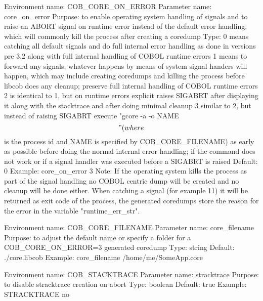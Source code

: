 Environment name:  COB_CORE_ON_ERROR
  Parameter name:  core_on_error
         Purpose:  to enable operating system handling of signals and to
                   raise an ABORT signal on runtime error instead of the
                   default error handling, which will commonly kill the
                   process after creating a coredump
            Type:  0   means catching all default signals and do full
                       internal error handling as done in versions pre 3.2
                       along with full internal handling of COBOL runtime
                       errors
                   1   means to forward any signals; whatever happens
                       by means of system signal handers will happen,
                       which may include creating coredumps and killing
                       the process before libcob does any cleanup; preserve
                       full internal handling of COBOL runtime errors
                   2   is identical to 1, but on runtime errors explicit
                       raises SIGABRT after displaying it along with the  
                       stacktrace and after doing minimal cleanup
                   3   similar to 2, but instead of raising SIGABRT execute
                       "gcore -a -o NAME $$" (where $$ is the process id and
                       NAME is specified by COB_CORE_FILENAME) as early as
                       possible before doing the normal internal error
                       handling; if the command does not work or if a signal
                       handler was executed before a SIGABRT is raised
         Default:  0
         Example:  core_on_error 3
            Note:  If the operating system kills the process as part of the
                   signal handling no COBOL centric dump will be created and
                   no cleanup will be done either.
                   When catching a signal (for example 11) it will be
                   returned as exit code of the process, the generated
                   coredumps store the reason for the error in the variable
                   "runtime_err_str".

Environment name:  COB_CORE_FILENAME
  Parameter name:  core_filename
         Purpose:  to adjust the default name or specify a folder for a
                   COB_CORE_ON_ERROR=3 generated coredump
            Type:  string
         Default:  ./core.libcob
         Example:  core_filename /home/me/SomeApp.core

Environment name:  COB_STACKTRACE
  Parameter name:  stracktrace
         Purpose:  to disable stracktrace creation on abort
            Type:  boolean
         Default:  true
         Example:  STRACKTRACE  no


